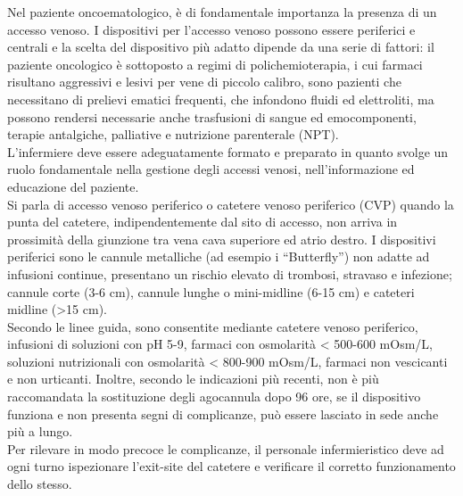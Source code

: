 Nel paziente oncoematologico, è di fondamentale importanza la presenza di un accesso venoso. I dispositivi per 
l’accesso venoso possono essere periferici e centrali e la scelta del dispositivo più adatto dipende da una serie di 
fattori: il paziente oncologico è sottoposto a regimi di polichemioterapia, i cui farmaci risultano aggressivi e 
lesivi per vene di piccolo calibro, sono pazienti che necessitano di prelievi ematici frequenti, che infondono fluidi 
ed elettroliti, ma possono rendersi necessarie anche trasfusioni di sangue ed emocomponenti, terapie antalgiche, 
palliative e nutrizione parenterale (NPT).\\
L’infermiere deve essere adeguatamente formato e preparato in quanto svolge un ruolo fondamentale nella gestione 
degli accessi venosi, nell’informazione ed educazione del paziente.\\ %
Si parla di accesso venoso periferico o catetere venoso periferico (CVP) quando la punta del catetere, 
indipendentemente dal sito di accesso, non arriva in prossimità della giunzione tra vena cava superiore ed atrio destro. 
I dispositivi periferici sono le cannule metalliche (ad esempio i “Butterfly”) non adatte ad infusioni continue, 
presentano un rischio elevato di trombosi, stravaso e infezione; cannule corte (3-6 cm), cannule lunghe o 
mini-midline (6-15 cm) e cateteri midline (>15 cm)\cite{GAVECELTCVC}.\\
Secondo le linee guida, sono consentite mediante catetere venoso periferico, infusioni di soluzioni con pH 5-9, 
farmaci con osmolarità < 500-600 mOsm/L, soluzioni nutrizionali con osmolarità < 800-900 mOsm/L, farmaci non 
vescicanti e non urticanti. Inoltre, secondo le indicazioni più recenti, non è più raccomandata la sostituzione 
degli agocannula dopo 96 ore, se il dispositivo funziona e non presenta segni di complicanze, 
può essere lasciato in sede anche più a lungo\cite{GAVECELTCVC}.\\
Per rilevare in modo precoce le complicanze, il personale infermieristico deve ad ogni turno ispezionare 
l’exit-site del catetere e verificare il corretto funzionamento dello stesso\cite{GAVECELTracc2021}.\\

